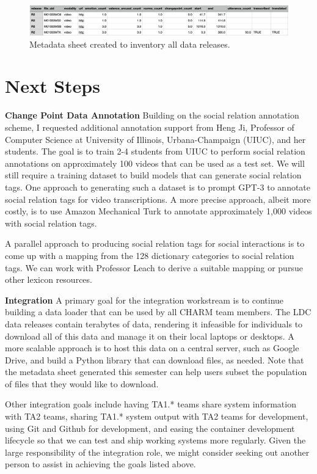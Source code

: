 \documentclass[12pt]{article}
\begin{document}
\begin{figure}[H]
    \centering
    \includegraphics[width=1.0\textwidth]{metadata.png}
    \caption{Metadata sheet created to inventory all data releases.}
    \label{fig:metadata}
\end{figure}

\section{Next Steps}
\textbf{Change Point Data Annotation} Building on the social relation annotation scheme, I requested additional annotation support from Heng Ji, Professor of Computer Science at University of Illinois, Urbana-Champaign (UIUC), and her students. The goal is to train 2-4 students from UIUC to perform social relation annotations on approximately 100 videos that can be used as a test set. We will still require a training dataset to build models that can generate social relation tags. One approach to generating such a dataset is to prompt GPT-3 to annotate social relation tags for video transcriptions. A more precise approach, albeit more costly, is to use Amazon Mechanical Turk to annotate approximately 1,000 videos with social relation tags.

A parallel approach to producing social relation tags for social interactions is to come up with a mapping from the 128 dictionary categories to social relation tags. We can work with Professor Leach to derive a suitable mapping or pursue other lexicon resources.

\textbf{Integration} A primary goal for the integration workstream is to continue building a data loader that can be used by all CHARM team members. The LDC data releases contain terabytes of data, rendering it infeasible for individuals to download all of this data and manage it on their local laptops or desktops. A more scalable approach is to host this data on a central server, such as Google Drive, and build a Python library that can download files, as needed. Note that the metadata sheet generated this semester can help users subset the population of files that they would like to download.

Other integration goals include having TA1.* teams share system information with TA2 teams, sharing TA1.* system output with TA2 teams for development, using Git and Github for development, and easing the container development lifecycle so that we can test and ship working systems more regularly. Given the large responsibility of the integration role, we might consider seeking out another person to assist in achieving the goals listed above.
\printbibliography
\end{document}
